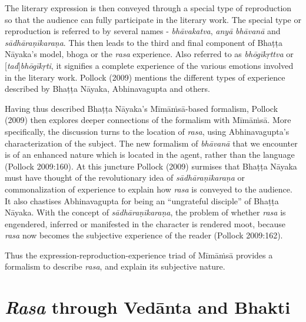 \newpage

The literary expression is then conveyed through a special type of reproduction so that the audience can fully participate in the literary work. The special type or reproduction is referred to by several names - \textsl{bhāvakatva}, \textsl{anyā} \textsl{bhāvanā} and \textsl{sādhāraṇīkaraṇa}. This then leads to the third and final component of Bhaṭṭa Nāyaka’s model, bhoga or the \textsl{rasa} experience. Also referred to as \textsl{bhōgīkṛttva} or [\textsl{tad}]\textsl{bhōgīkṛti}, it signifies a complete experience of the various emotions involved in the literary work. Pollock (2009) mentions the different types of experience described by Bhaṭṭa Nāyaka, Abhinavagupta and others. 

Having thus described Bhaṭṭa Nāyaka’s Mīmāṁsā-based formalism, Pollock (2009) then explores deeper connections of the formalism with Mīmāṁsā. More specifically, the discussion turns to the location of \textsl{rasa}, using Abhinavagupta’s characterization of the subject. The new formalism of \textsl{bhāvanā} that we encounter is of an enhanced nature which is located in the agent, rather than the language (Pollock 2009:160). At this juncture Pollock (2009) surmises that Bhaṭṭa Nāyaka must have thought of the revolutionary idea of \textsl{sādhāraṇīkaraṇa} or commonalization of experience to explain how \textsl{rasa} is conveyed to the audience. It also chastises Abhinavagupta for being an “ungrateful disciple” of Bhaṭṭa Nāyaka. With the concept of \textsl{sādhāraṇīkaraṇa}, the problem of whether \textsl{rasa} is engendered, inferred or manifested in the character is rendered moot, because \textsl{rasa} now becomes the subjective experience of the reader (Pollock 2009:162).

Thus the expression-reproduction-experience triad of Mīmāṁsā provides a formalism to describe \textsl{rasa}, and explain its subjective nature.

\section*{\textsl{Rasa} through Vedānta and Bhakti}

